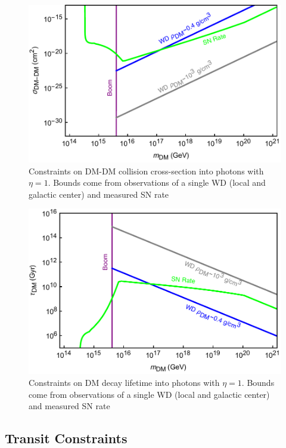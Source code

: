 \documentclass[twocolumn,showpacs,preprintnumbers,amsmath,amssymb,prd]{revtex4}
\begin{document}
\begin{figure}
\includegraphics[scale=.45]{collisionobservation.pdf}
\caption{Constraints on DM-DM collision cross-section into photons with $\eta =1$. Bounds come from observations of a single WD (local and galactic center) and measured SN rate}
\label{fig:collisionclasses}
\end{figure}

\begin{figure}
\includegraphics[scale=.45]{decayobservation.pdf}
\caption{Constraints on DM decay lifetime into photons with $\eta =1$. Bounds come from observations of a single WD (local and galactic center) and measured SN rate}
\label{fig:decayclasses}
\end{figure}
 
\subsection{Transit Constraints}
\label{sec:TransitConstraints}
\end{document}
